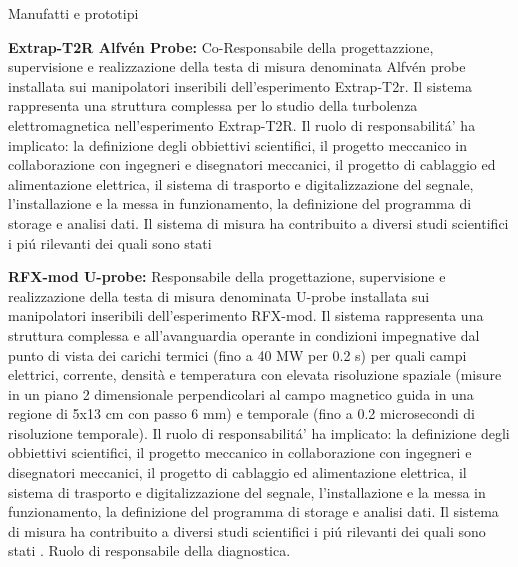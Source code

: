 \begin{statementblock}{Manufatti e prototipi}
\end{statementblock}
\begin{enumerate}[label={[Q\arabic*]}]
\item \textbf{Extrap-T2R Alfv{\'e}n Probe:}  Co-Responsabile della progettazzione, 
  supervisione e realizzazione della testa di misura
  denominata Alfv{\'e}n probe installata sui manipolatori inseribili
  dell'esperimento Extrap-T2r. Il sistema rappresenta una struttura
  complessa per lo studio della turbolenza elettromagnetica
  nell'esperimento Extrap-T2R. Il
  ruolo di responsabilit{\'a'} ha implicato: la definizione degli
  obbiettivi scientifici, il progetto meccanico in collaborazione con
  ingegneri e disegnatori meccanici, il progetto di cablaggio ed
  alimentazione elettrica, il sistema di trasporto e digitalizzazione
  del segnale, l'installazione e la messa in funzionamento,  la
  definizione del programma di storage e analisi dati. Il sistema di
  misura ha contribuito a diversi studi scientifici i pi{\'u}
  rilevanti dei quali sono stati \cite{Vianello:2005p1976, Vianello:2006p1149}
   
\item \textbf{RFX-mod U-probe:}  Responsabile della progettazione, 
  supervisione e realizzazione della testa di misura
  denominata U-probe installata sui manipolatori inseribili
  dell'esperimento RFX-mod. Il sistema rappresenta una struttura
  complessa e all'avanguardia operante in condizioni impegnative dal
  punto di vista dei carichi termici
  (fino a 40 MW per 0.2 s) per quali campi elettrici, corrente,
  densità e temperatura con elevata risoluzione spaziale
  (misure in un piano 2 dimensionale perpendicolari al campo magnetico
  guida in una regione di 5x13 cm con passo 6 mm)
  e temporale (fino a 0.2 microsecondi di risoluzione temporale). Il
  ruolo di responsabilit{\'a'} ha implicato: la definizione degli
  obbiettivi scientifici, il progetto meccanico in collaborazione con
  ingegneri e disegnatori meccanici, il progetto di cablaggio ed
  alimentazione elettrica, il sistema di trasporto e digitalizzazione
  del segnale, l'installazione e la messa in funzionamento,  la
  definizione del programma di storage e analisi dati. Il sistema di
  misura ha contribuito a diversi studi scientifici i pi{\'u}
  rilevanti dei quali sono stati \cite{Spolaore:2009p4115,
    Vianello:2010p4670, Zuin:2009p3794, Vianello:2016bm}. Ruolo di
  responsabile della diagnostica.


\end{enumerate}

